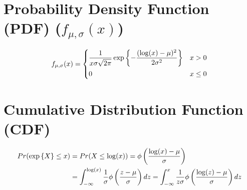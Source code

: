 \section{Probability Density Function (PDF) ($f_{\mu,\sigma}(x)$) \cite{ism-1}} \label{Lognormal Distribution: PDF}

\[
    f_{\mu,\sigma}(x)
    = \begin{cases}
        \dfrac{1}{x\sigma\sqrt{2\pi}}
        \exp\left\{-\dfrac{(\log(x) - \mu)^2}{2\sigma^2}\right\} & x > 0 \\[2ex]
        
        0 & x \leq 0
    \end{cases}
\]


\section{Cumulative Distribution Function (CDF) \cite{ism-1}} \label{Lognormal Distribution: CDF}

\begin{align*}
    Pr(\exp\left\{X\right\} \leq x) 
    &= Pr(X \leq \log(x))
    = \phi\left(\dfrac{\log(x) - \mu}{\sigma}\right) \\
    &= \displaystyle\int_{-\infty}^{\log(x)} \dfrac{1}{\sigma}
        \phi\left(\dfrac{z - \mu}{\sigma}\right) dz
    = \displaystyle\int_{-\infty}^{x} \dfrac{1}{z\sigma}
        \phi\left(\dfrac{\log(z) - \mu}{\sigma}\right) dz \\
\end{align*}


